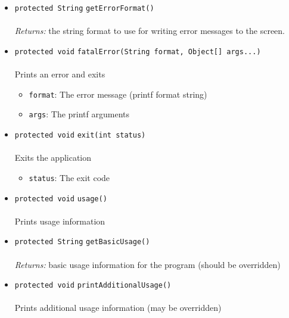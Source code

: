 \begin{itemize}
\item \lstinline|protected String| \lstinline|getErrorFormat|\lstinline|()|\\ \\[-0.6em]
\emph{Returns:} the string format to use for writing error messages to the
 screen.



\item \lstinline|protected void| \lstinline|fatalError|\lstinline|(String format, Object[] args...)|\\ \\[-0.6em]
Prints an error and exits
\begin{itemize}
\item \lstinline|format|: The error message (printf format string)
\item \lstinline|args|: The printf arguments
\end{itemize}



\item \lstinline|protected void| \lstinline|exit|\lstinline|(int status)|\\ \\[-0.6em]
Exits the application
\begin{itemize}
\item \lstinline|status|: The exit code
\end{itemize}



\item \lstinline|protected void| \lstinline|usage|\lstinline|()|\\ \\[-0.6em]
Prints usage information



\item \lstinline|protected String| \lstinline|getBasicUsage|\lstinline|()|\\ \\[-0.6em]
\emph{Returns:} basic usage information for the program (should be overridden)



\item \lstinline|protected void| \lstinline|printAdditionalUsage|\lstinline|()|\\ \\[-0.6em]
Prints additional usage information (may be overridden)



\end{itemize}

